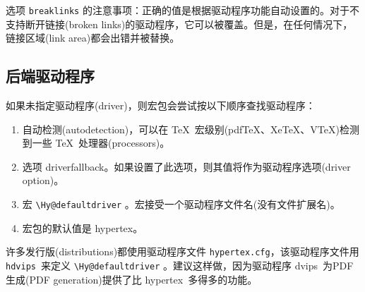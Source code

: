 \documentclass{article}
\newcommand*{\cs}[1]{%
  \texttt{\textbackslash #1}%
}
\newcommand{\heiti}{\CJKfamily{heiti}} %
\begin{document}
选项 \verb|breaklinks| 的注意事项：正确的值是根据驱动程序功能自动设置的。对于不支持断开链接(broken links)的驱动程序，它可以被覆盖。但是，在任何情况下，链接区域(link area)都会出错并被替换。

\subsection[后端驱动程序]{\heiti 后端驱动程序}

如果未指定驱动程序(driver)，则宏包会尝试按以下顺序查找驱动程序：
\begin{enumerate}
\item 自动检测(autodetection)，可以在 \TeX\ 宏级别(pdf\TeX、Xe\TeX、V\TeX)检测到一些 \TeX\ 处理器(processors)。
\item 选项 \textsf{driverfallback}。如果设置了此选项，则其值将作为驱动程序选项(driver option)。
\item 宏 \cs{Hy@defaultdriver}。宏接受一个驱动程序文件名(没有文件扩展名)。
\item 宏包的默认值是 \textsf{hypertex}。
\end{enumerate}
许多发行版(distributions)都使用驱动程序文件 \texttt{hypertex.cfg}，该驱动程序文件用 \texttt{hdvips}\ 来定义 \cs{Hy@defaultdriver}。建议这样做，因为驱动程序 \textsf{dvips}\ 为PDF生成(PDF generation)提供了比 \textsf{hypertex}\ 多得多的功能。
\end{document}
